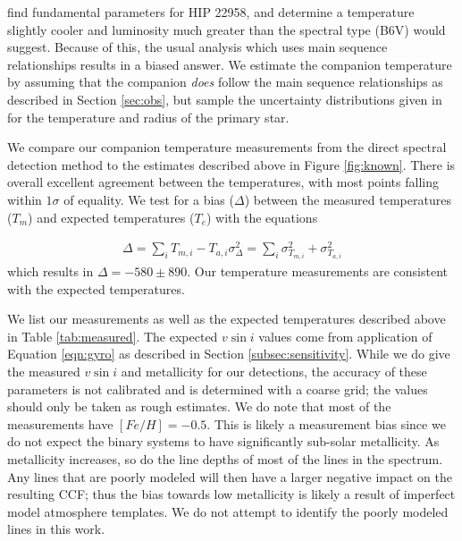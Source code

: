 \documentclass{emulateapj}
\begin{document}
\citet{Zorec2012} find fundamental parameters for HIP 22958, and determine a temperature slightly cooler and luminosity much greater than the spectral type (B6V) would suggest. Because of this, the usual analysis which uses main sequence relationships results in a biased answer. We estimate the companion temperature by assuming that the companion \emph{does} follow the main sequence relationships as described in Section \ref{sec:obs}, but sample the uncertainty distributions given in \citet{Zorec2012} for the temperature and radius of the primary star.

We compare our companion temperature measurements from the direct spectral detection method to the estimates described above in Figure \ref{fig:known}. There is overall excellent agreement between the temperatures, with most points falling within $1 \sigma$ of equality. We test for a bias ($\Delta$) between the measured temperatures ($T_m$) and expected temperatures ($T_e$) with the equations

\begin{eqnarray}
\Delta = \sum_iT_{m,i} - T_{a,i}
\sigma_{\Delta}^2 = \sum_i \sigma_{T_{m,i}}^2 + \sigma_{T_{a,i}}^2
\end{eqnarray}
which results in $\Delta = -580 \pm 890$. Our temperature measurements are consistent with the expected temperatures.

We list our measurements as well as the expected temperatures described above in Table \ref{tab:measured}. The expected $v\sin{i}$ values come from application of Equation \ref{eqn:gyro} as described in Section \ref{subsec:sensitivity}. While we do give the measured $v\sin{i}$ and metallicity for our detections, the accuracy of these parameters is not calibrated and is determined with a coarse grid; the values should only be taken as rough estimates. We do note that most of the measurements have $[Fe/H] = -0.5$. This is likely a measurement bias since we do not expect the binary systems to have significantly sub-solar metallicity. As metallicity increases, so do the line depths of most of the lines in the spectrum. Any lines that are poorly modeled will then have a larger negative impact on the resulting CCF; thus the bias towards low metallicity is likely a result of imperfect model atmosphere templates. We do not attempt to identify the poorly modeled lines in this work.
\end{document}
